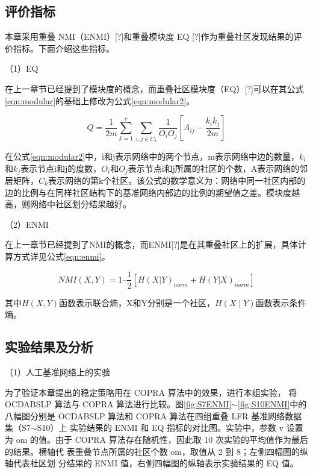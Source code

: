 \subsection{评价指标}
本章采用重叠 NMI（ENMI）[?]和重叠模块度 EQ
[?]作为重叠社区发现结果的评价指标。下面介绍这些指标。

（1）EQ

在上一章节已经提到了模块度的概念，而重叠社区模块度（EQ）[?]可以在其公式\ref{eqn:modular}的基础上修改为公式\ref{eqn:modular2}。

\begin{equation}
  \label{eqn:modular2}
  Q=\frac{1}{2m} \sum_{k=1}^c \sum_{i,j \in C_k} \frac{1}{O_iO_j} \left [ A_{ij}-\frac{k_ik_j}{2m} \right ]  
\end{equation}

在公式\ref{eqn:modular2}中，i和j表示网络中的两个节点，m表示网络中边的数量，$k_i$和$k_j$表示节点i和j的度数，$O_i$和$O_j$表示节点i和j所属的社区的个数，A表示网络的邻居矩阵，$C_k$表示网络的第k个社区。该公式的数学意义为：网络中同一社区内部的边的比例与在同样社区结构下的基准网络内部边的比例的期望值之差。模块度越高，则网络中社区划分结果越好。


（2）ENMI

在上一章节已经提到了NMI的概念，而ENMI[?]是在其重叠社区上的扩展，具体计算方式详见公式\ref{eqn:enmi}。

\begin{equation}
  \label{eqn:enmi}
  NMI(X,Y) = 1 – \frac{1}{2} [H(X|Y)_{norm} + H(Y|X)_{norm}]
\end{equation}

其中$H(X,Y)$函数表示联合熵，X和Y分别是一个社区，$H(X \mid Y)$函数表示条件熵。

\subsection{实验结果及分析}

（1）人工基准网络上的实验

为了验证本章提出的稳定策略用在 COPRA 算法中的效果，进行本组实验，
将 OCDABSLP 算法与 COPRA 算法进行比较。图\ref{fig:S7ENMI}$\sim$\ref{fig:S10ENMI}中的八幅图分别是
OCDABSLP 算法和 COPRA 算法在四组重叠 LFR 基准网络数据集（S7$\sim$S10）上
实验结果的 ENMI 和 EQ 指标的对比图。实验中，参数 v 设置为 om 的值。由于
COPRA 算法存在随机性，因此取 10 次实验的平均值作为最后的结果。横轴代
表重叠节点所属的社区个数 om，取值从 2 到 8；左侧四幅图的纵轴代表社区划
分结果的 ENMI 值，右侧四幅图的纵轴表示实验结果的 EQ 值。 


